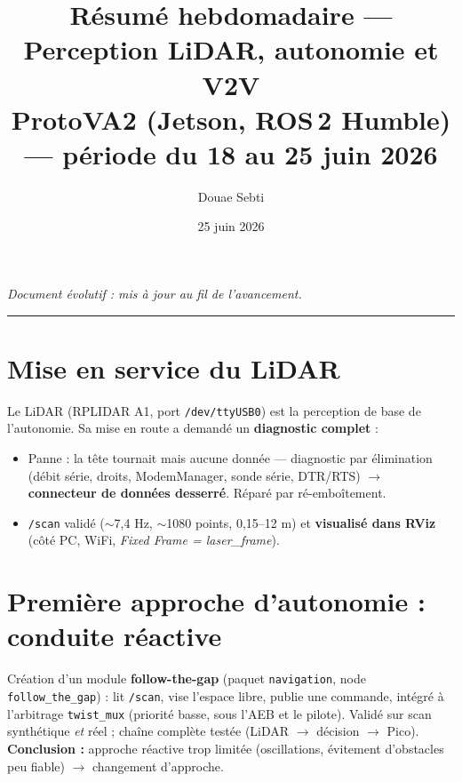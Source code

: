 \documentclass[a4paper,11pt]{article}
\title{\textbf{Résumé hebdomadaire --- Perception LiDAR, autonomie et V2V}\\
\large ProtoVA2 (Jetson, ROS\,2 Humble) --- période du 18 au 25 juin 2026}
\author{Douae Sebti}
\date{25 juin 2026}
\begin{document}
\maketitle

\noindent\emph{Document évolutif : mis à jour au fil de l'avancement.}
\vspace{4pt}\hrule

\section{Mise en service du LiDAR}
Le LiDAR (RPLIDAR A1, port \texttt{/dev/ttyUSB0}) est la perception de base de
l'autonomie. Sa mise en route a demandé un \textbf{diagnostic complet} :
\begin{itemize}[leftmargin=1.4em, nosep]
  \item Panne : la tête tournait mais aucune donnée --- diagnostic par
        élimination (débit série, droits, ModemManager, sonde série, DTR/RTS)
        $\rightarrow$ \textbf{connecteur de données desserré}. Réparé par
        ré-emboîtement.
  \item \texttt{/scan} validé ($\sim$7,4 Hz, $\sim$1080 points, 0,15--12 m) et
        \textbf{visualisé dans RViz} (côté PC, WiFi, \emph{Fixed Frame =
        laser\_frame}).
\end{itemize}

\section{Première approche d'autonomie : conduite réactive}
Création d'un module \textbf{follow-the-gap} (paquet \texttt{navigation}, node
\texttt{follow\_the\_gap}) : lit \texttt{/scan}, vise l'espace libre, publie une
commande, intégré à l'arbitrage \texttt{twist\_mux} (priorité basse, sous l'AEB et
le pilote). Validé sur scan synthétique \emph{et} réel ; chaîne complète testée
(LiDAR $\rightarrow$ décision $\rightarrow$ Pico). \textbf{Conclusion :} approche
réactive trop limitée (oscillations, évitement d'obstacles peu fiable)
$\rightarrow$ changement d'approche.
\end{document}
